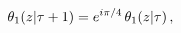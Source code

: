 \[\mathop{\theta_{1}\/}\nolimits\!\left(z\middle|\tau+1\right)=e^{i\pi/4}\mathop%
{\theta_{1}\/}\nolimits\!\left(z\middle|\tau\right),\]